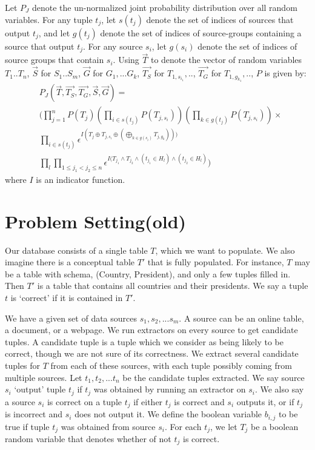 \documentclass{sig-alternate}
\newcounter{prob}
\begin{document}
Let $P_J$ denote the un-normalized joint probability distribution over all random variables. For any tuple $t_j$, let $s(t_j)$ denote the set of indices of sources that output $t_j$, and let $g(t_j)$ denote the set of indices of source-groups containing a source that output $t_j$. For any source $s_i$, let $g(s_i)$ denote the set of indices of source groups that contain $s_i$. 
Using $\overrightarrow{T}$ to denote the vector of random variables $T_1..T_n$, $\overrightarrow{S}$ for $S_1..S_m$, $\overrightarrow{G}$ for $G_1, ... G_k$, $\overrightarrow{T_S}$ for $T_{1, s_{i_1}}, ..$, $\overrightarrow{T_G}$ for $T_{1, g_{k_1}}, ..$, $P$ is given by:
\begin{align*} 
& P_J(\overrightarrow{T}, \overrightarrow{T_S}, \overrightarrow{T_G}, \overrightarrow{S}, \overrightarrow{G}) =
\\& (\prod_{j=1}^{n} P(T_j) (\prod_{i\in s(t_j)} P(T_{j, s_i})) (\prod_{k\in g(t_j)} P(T_{j, s_i})) \times 
\\& \prod_{i\in s(t_j)} \epsilon^{I(T_j \oplus T_{j, s_i} \oplus(\bigoplus_{k\in g(s_i)} T_{j, g_k})))}
\\& \prod_{l} \prod_{1 \leq j_1 < j_2 \leq n} \epsilon^{I(T_{j_1} \land T_{j_2} \land (t_{j_1}\in H_l) \land (t_{j_2} \in H_l)})
\end{align*}
where $I$ is an indicator function.



\section{Problem Setting(old)}
Our database consists of a single table $T$, which we want to populate. We also imagine there is a conceptual table $T'$ that is fully populated. For instance, $T$ may be a table with schema, (Country, President), and only a few tuples filled in. Then $T'$ is a table that contains all countries and their presidents. We say a tuple $t$ is `correct' if it is contained in $T'$. 

We have a given set of data sources $s_1, s_2, ... s_m$. A source can be an online table, a document, or a webpage. We run extractors on every source to get candidate tuples. A candidate tuple is a tuple which we consider as being likely to be correct, though we are not sure of its correctness. We extract several candidate tuples for $T$ from each of these sources, with each tuple possibly coming from multiple sources. Let $t_1, t_2, ... t_n$ be the candidate tuples extracted. We say source $s_i$ `output' tuple $t_j$ if $t_j$ was obtained by running an extractor on $s_i$. We also say a source $s_i$ is correct on a tuple $t_j$ if either $t_j$ is correct and $s_i$ outputs it, or if $t_j$ is incorrect and $s_i$ does not output it. We define the boolean variable $b_{i,j}$ to be true if tuple $t_j$ was obtained from source $s_i$. For each $t_j$, we let $T_j$ be a boolean random variable that denotes whether of not $t_j$ is correct. 
\end{document}
